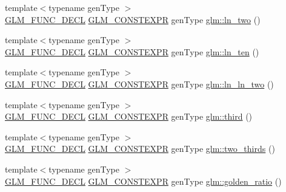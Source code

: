 \begin{DoxyCompactItemize}
\item 
{\footnotesize template$<$typename gen\+Type $>$ }\\\mbox{\hyperlink{setup_8hpp_ab2d052de21a70539923e9bcbf6e83a51}{G\+L\+M\+\_\+\+F\+U\+N\+C\+\_\+\+D\+E\+CL}} \mbox{\hyperlink{setup_8hpp_a08b807947b47031d3a511f03f89645ad}{G\+L\+M\+\_\+\+C\+O\+N\+S\+T\+E\+X\+PR}} gen\+Type \mbox{\hyperlink{group__gtc__constants_ga24f4d27765678116f41a2f336ab7975c}{glm\+::ln\+\_\+two}} ()
\item 
{\footnotesize template$<$typename gen\+Type $>$ }\\\mbox{\hyperlink{setup_8hpp_ab2d052de21a70539923e9bcbf6e83a51}{G\+L\+M\+\_\+\+F\+U\+N\+C\+\_\+\+D\+E\+CL}} \mbox{\hyperlink{setup_8hpp_a08b807947b47031d3a511f03f89645ad}{G\+L\+M\+\_\+\+C\+O\+N\+S\+T\+E\+X\+PR}} gen\+Type \mbox{\hyperlink{group__gtc__constants_gaf97ebc6c059ffd788e6c4946f71ef66c}{glm\+::ln\+\_\+ten}} ()
\item 
{\footnotesize template$<$typename gen\+Type $>$ }\\\mbox{\hyperlink{setup_8hpp_ab2d052de21a70539923e9bcbf6e83a51}{G\+L\+M\+\_\+\+F\+U\+N\+C\+\_\+\+D\+E\+CL}} \mbox{\hyperlink{setup_8hpp_a08b807947b47031d3a511f03f89645ad}{G\+L\+M\+\_\+\+C\+O\+N\+S\+T\+E\+X\+PR}} gen\+Type \mbox{\hyperlink{group__gtc__constants_gaca94292c839ed31a405ab7a81ae7e850}{glm\+::ln\+\_\+ln\+\_\+two}} ()
\item 
{\footnotesize template$<$typename gen\+Type $>$ }\\\mbox{\hyperlink{setup_8hpp_ab2d052de21a70539923e9bcbf6e83a51}{G\+L\+M\+\_\+\+F\+U\+N\+C\+\_\+\+D\+E\+CL}} \mbox{\hyperlink{setup_8hpp_a08b807947b47031d3a511f03f89645ad}{G\+L\+M\+\_\+\+C\+O\+N\+S\+T\+E\+X\+PR}} gen\+Type \mbox{\hyperlink{group__gtc__constants_ga3077c6311010a214b69ddc8214ec13b5}{glm\+::third}} ()
\item 
{\footnotesize template$<$typename gen\+Type $>$ }\\\mbox{\hyperlink{setup_8hpp_ab2d052de21a70539923e9bcbf6e83a51}{G\+L\+M\+\_\+\+F\+U\+N\+C\+\_\+\+D\+E\+CL}} \mbox{\hyperlink{setup_8hpp_a08b807947b47031d3a511f03f89645ad}{G\+L\+M\+\_\+\+C\+O\+N\+S\+T\+E\+X\+PR}} gen\+Type \mbox{\hyperlink{group__gtc__constants_ga9b4d2f4322edcf63a6737b92a29dd1f5}{glm\+::two\+\_\+thirds}} ()
\item 
{\footnotesize template$<$typename gen\+Type $>$ }\\\mbox{\hyperlink{setup_8hpp_ab2d052de21a70539923e9bcbf6e83a51}{G\+L\+M\+\_\+\+F\+U\+N\+C\+\_\+\+D\+E\+CL}} \mbox{\hyperlink{setup_8hpp_a08b807947b47031d3a511f03f89645ad}{G\+L\+M\+\_\+\+C\+O\+N\+S\+T\+E\+X\+PR}} gen\+Type \mbox{\hyperlink{group__gtc__constants_ga748cf8642830657c5b7eae04d0a80899}{glm\+::golden\+\_\+ratio}} ()
\end{DoxyCompactItemize}


